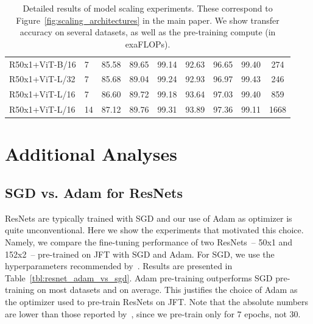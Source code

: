 \begin{table}[]
{\begin{tabular}{llccccccc}
R50x1+ViT-B/16 &       7 &     85.58 &          89.65 &     99.14 &      92.63 & 96.65 &    99.40 &       274 \\
R50x1+ViT-L/32 &       7 &     85.68 &          89.04 &     99.24 &      92.93 & 96.97 &    99.43 &       246 \\
R50x1+ViT-L/16 &       7 &     86.60 &          89.72 &     99.18 &      93.64 & 97.03 &    99.40 &       859 \\
R50x1+ViT-L/16 &      14 &     87.12 &          89.76 &     99.31 &      93.89 & 97.36 &    99.11 &      1668 \\
\bottomrule
\end{tabular}
}
\caption{Detailed results of model scaling experiments. These correspond to Figure~\ref{fig:scaling_architectures} in the main paper. We show transfer accuracy on several datasets, as well as the pre-training compute (in exaFLOPs).}
\label{tbl:scaling_architectures}
\end{table}


\section{Additional Analyses}
\label{sec:additional_analyses}

\subsection{SGD vs. Adam for ResNets}
\label{sec:sgd_vs_adam}

ResNets are typically trained with SGD and our use of Adam as optimizer is quite unconventional.
Here we show the experiments that motivated this choice.
Namely, we compare the fine-tuning performance of two ResNets~-- 50x1 and 152x2~-- pre-trained on JFT with SGD and Adam.
For SGD, we use the hyperparameters recommended by~\citet{kolesnikov2020-bit}.
Results are presented in Table~\ref{tbl:resnet_adam_vs_sgd}.
Adam pre-training outperforms SGD pre-training on most datasets and on average.
This justifies the choice of Adam as the optimizer used to pre-train ResNets on JFT.
Note that the absolute numbers are lower than those reported by~\citet{kolesnikov2020-bit}, since we pre-train only for $7$ epochs, not $30$.

